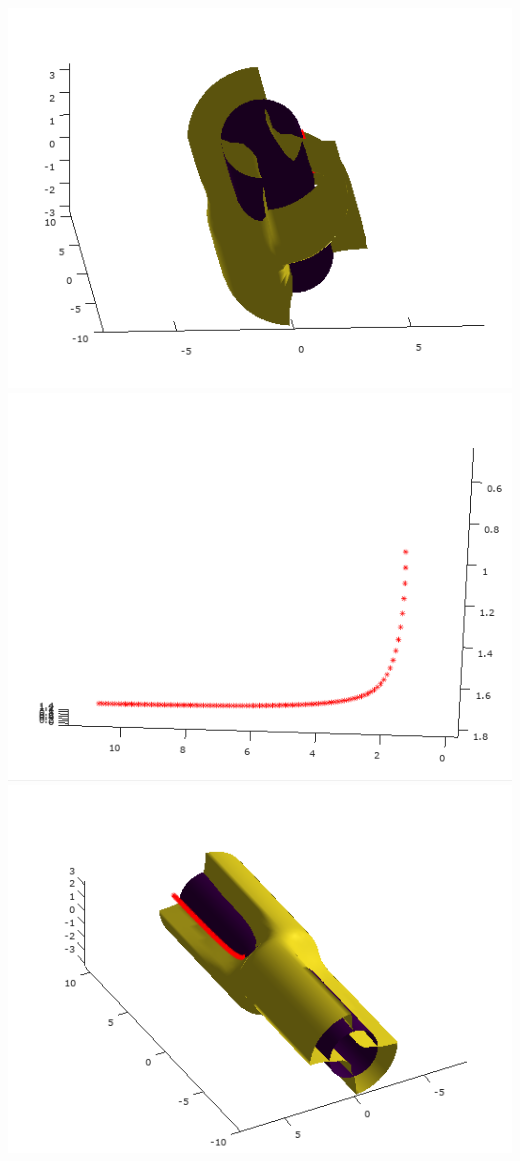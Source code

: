 \documentclass[]{article}
\begin{document}
	\includegraphics[scale=0.5]{primer5_2} 
	\includegraphics[scale=0.5]{primer5_3}
	\includegraphics[scale=0.5]{primer5_4} 
\end{document}
